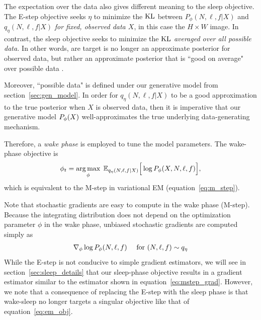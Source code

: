 The expectation over the data also gives different meaning to the sleep objective. The E-step objective seeks $\eta$ to minimize the $\textrm{KL}$ between $P_\phi(N, \ell, f | X)$ and $q_\eta(N, \ell, f | X)$ {\itshape for fixed, observed data $X$}, 
in this case the $H\times W$ image. In contrast, the sleep objective seeks to minimize the $\textrm{KL}$ {\itshape averaged over all possible data. } In other words, are target is no longer an approximate posterior for observed data, but rather an approximate posterior that is ``good on average" over possible data .

Moreover, ``possible data" is defined under our generative model from section~\ref{sec:gen_model}. In order for $q_\eta(N, \ell, f | X)$ to be a good approximation to
the true posterior when $X$ is observed data, then it is imperative that our generative model $P_\phi(X)$ well-approximates the true underlying data-generating mechanism. 

Therefore, a {\itshape wake phase} is employed to tune the model parameters. The wake-phase objective is
\begin{align}
    \phi_{t} = \operatorname*{arg\,max}_{\phi} \; \mathbb{E}_{q_{\eta}(N, \ell, f | X)}\Big[\log P_\phi(X, N, \ell, f)\Big], 
    \label{eq:wake_elbo}
\end{align}
which is equivalent to the M-step in variational EM (equation~\ref{eq:m_step}). 

Note that stochastic gradients are easy to compute in the wake phase (M-step). Because the integrating distribution does not depend on the optimization parameter $\phi$ in the wake phase, unbiased stochastic gradients are computed simply as 
\begin{align}
    \nabla_\phi \log P_\phi(N, \ell, f) \quad \text{ for } (N, \ell, f)\sim q_\eta
    \label{eq:mstep_grad}
\end{align}
While the E-step is not conducive to simple gradient estimators, we will see in section~\ref{sec:sleep_details} that our sleep-phase objective
results in a gradient estimator similar to the estimator shown in equation~\eqref{eq:mstep_grad}. However,
we note that a consequence of replacing the E-step with the sleep phase is that wake-sleep no longer targets a singular objective like that of equation~\eqref{eq:em_obj}. 


